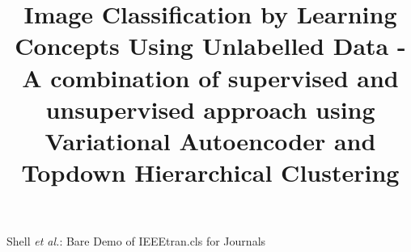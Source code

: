 \documentclass[journal]{IEEEtran}
\begin{document}
%
\title{ Image Classification by Learning Concepts Using Unlabelled Data  - A combination of supervised and unsupervised approach using Variational Autoencoder and Topdown Hierarchical Clustering}
%
%
%



% 
%



%
{Shell \MakeLowercase{\textit{et al.}}: Bare Demo of IEEEtran.cls for Journals}
% 
\end{document}
